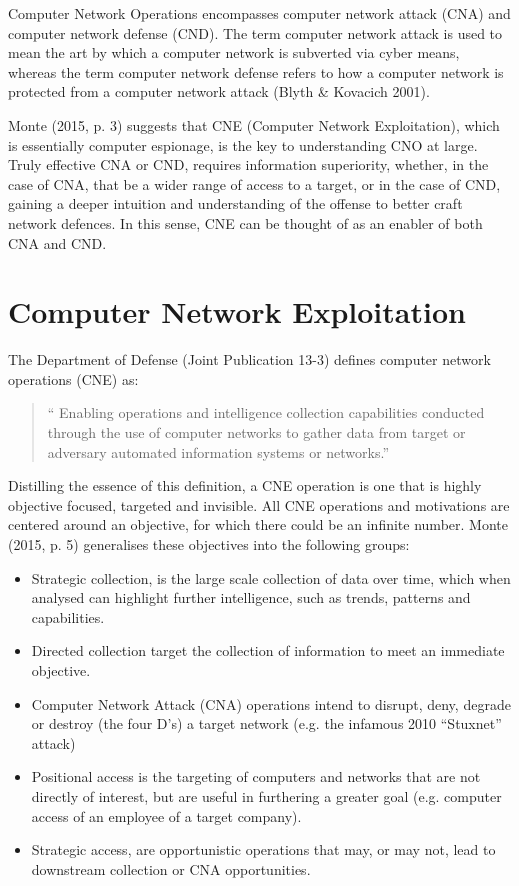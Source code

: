 \documentclass[11pt]{report}
\begin{document}
Computer Network Operations encompasses computer network attack (CNA) and computer network defense (CND). The term computer network attack is used to mean the art by which a computer network is subverted via cyber means, whereas the term computer network defense refers to how a computer network is protected from a computer network attack (Blyth \& Kovacich 2001).

Monte (2015, p. 3) suggests that CNE (Computer Network Exploitation), which is essentially computer espionage, is the key to understanding CNO at large. Truly effective CNA or CND, requires information superiority, whether, in the case of CNA, that be a wider range of access to a target, or in the case of CND, gaining a deeper intuition and understanding of the offense to better craft network defences. In this sense, CNE can be thought of as an enabler of both CNA and CND.



\section{Computer Network Exploitation}

The Department of Defense (Joint Publication 13-3) defines computer network operations (CNE) as: \begin{quote}`` Enabling operations and intelligence collection capabilities conducted through the use of computer networks to gather data from target or adversary automated information systems or networks.''\end{quote}

Distilling the essence of this definition, a CNE operation is one that is highly objective focused, targeted and invisible. All CNE operations and motivations are centered around an objective, for which there could be an infinite number. Monte (2015, p. 5) generalises these objectives into the following groups:

\begin{itemize}
	\item Strategic collection, is the large scale collection of data over time, which when analysed can highlight further intelligence, such as trends, patterns and capabilities.
	\item Directed collection target the collection of information to meet an immediate objective.
	\item Computer Network Attack (CNA) operations intend to disrupt, deny, degrade or destroy (the four D’s) a target network (e.g. the infamous 2010 “Stuxnet” attack)
	\item Positional access is the targeting of computers and networks that are not directly of interest, but are useful in furthering a greater goal (e.g. computer access of an employee of a target company).
	\item Strategic access, are opportunistic operations that may, or may not, lead to downstream collection or CNA opportunities.
\end{itemize}
\end{document}
